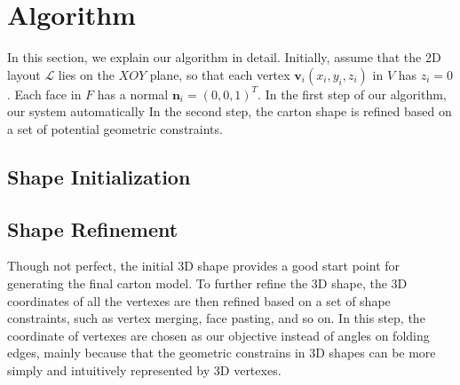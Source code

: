 \section{Algorithm}\label{sec:optimization}


In this section, we explain our algorithm in detail. 
Initially, assume that the 2D layout $\mathcal{L}$ lies on the $XOY$ plane, so that each vertex $\mathbf{v}_i(x_i,y_i,z_i)$ in $V$ has $z_i=0$. 
Each face in $F$ has a normal $\mathbf{n}_i=(0,0,1)^T$.
%
In the first step of our algorithm, our system automatically {\color{blue}{folds the original flat mesh into a rough model by assigning a specific angle to each folding edge.}}
In the second step, the carton shape is refined based on a set of potential geometric constraints.

\subsection{Shape Initialization}\label{sec:initialization}


\subsection{Shape Refinement}\label{sec:refinement}

Though not perfect, the initial 3D shape provides a good start point for generating the final carton model. 
%
To further refine the 3D shape, the 3D coordinates of all the vertexes are then refined based on a set of shape constraints, such as vertex merging, face pasting, and so on.
%
In this step, the coordinate of vertexes are chosen as our objective instead of angles on folding edges, mainly because that the geometric constrains in 3D shapes can be more simply and intuitively represented by 3D vertexes.
 


